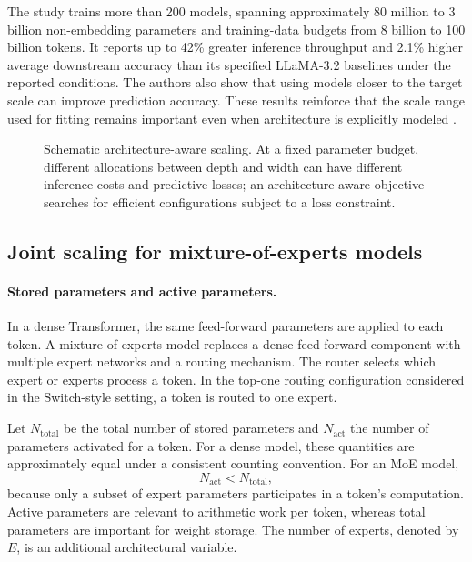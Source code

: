 The study trains more than 200 models, spanning approximately 80 million
to 3 billion non-embedding parameters and training-data budgets from
8 billion to 100 billion tokens. It reports up to 42\% greater inference
throughput and 2.1\% higher average downstream accuracy than its specified
LLaMA-3.2 baselines under the reported conditions. The authors also show
that using models closer to the target scale can improve prediction accuracy.
These results reinforce that the scale range used for fitting remains
important even when architecture is explicitly modeled
\parencite{Bian2026ArchitectureScaling}.

\begin{figure}[htbp]
    \centering
    
    \caption{Schematic architecture-aware scaling. At a fixed parameter
    budget, different allocations between depth and width can have different
    inference costs and predictive losses; an architecture-aware objective
    searches for efficient configurations subject to a loss constraint.}
    \label{fig:scaling-architecture}
\end{figure}

\subsection{Joint scaling for mixture-of-experts models}
\label{subsec:scaling-moe}

\paragraph{Stored parameters and active parameters.}
In a dense Transformer, the same feed-forward parameters are applied to each
token. A mixture-of-experts model replaces a dense feed-forward component
with multiple expert networks and a routing mechanism. The router selects
which expert or experts process a token. In the top-one routing configuration
considered in the Switch-style setting, a token is routed to one expert.

Let \(N_{\mathrm{total}}\) be the total number of stored parameters and
\(N_{\mathrm{act}}\) the number of parameters activated for a token. For a
dense model, these quantities are approximately equal under a consistent
counting convention. For an MoE model,
\begin{equation}
    N_{\mathrm{act}}<N_{\mathrm{total}},
    \label{eq:scaling-moe-active-total}
\end{equation}
because only a subset of expert parameters participates in a token's
computation. Active parameters are relevant to arithmetic work per token,
whereas total parameters are important for weight storage. The number of
experts, denoted by \(E\), is an additional architectural variable.

